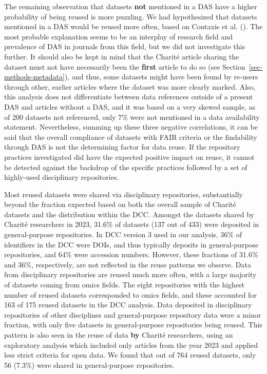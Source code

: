 \documentclass[
  letterpaper,
  DIV=11,
  numbers=noendperiod]{scrartcl}
\begin{document}
The remaining observation that datasets \textbf{not} mentioned in a DAS
have a higher probability of being reused is more puzzling. We had
hypothesized that datasets mentioned in a DAS would be reused more
often, based on Contaxis et al.
(). The most probable
explanation seems to be an interplay of research field and prevalence of
DAS in journals from this field, but we did not investigate this
further. It should also be kept in mind that the Charité article sharing
the dataset must not have necessarily been the \textbf{first} article to
do so (see Section~\ref{sec-methods-metadata}), and thus, some datasets
might have been found by re-users through other, earlier articles where
the dataset was more clearly marked. Also, this analysis does not
differentiate between data references outside of a present DAS and
articles without a DAS, and it was based on a very skewed sample, as of
200 datasets not referenced, only 7\% were not mentioned in a data
availability statement. Nevertheless, summing up these three negative
correlations, it can be said that the overall compliance of datasets
with FAIR criteria or the findability through DAS is not the determining
factor for data reuse. If the repository practices investigated did have
the expected positive impact on reuse, it cannot be detected against the
backdrop of the specific practices followed by a set of highly-used
disciplinary repositories.

Most reused datasets were shared via disciplinary repositories,
substantially beyond the fraction expected based on both the overall
sample of Charité datasets and the distribution within the DCC. Amongst
the datasets shared by Charité researchers in 2023, 31.6\% of datasets
(137 out of 433) were deposited in general-purpose repositories. In DCC
version 3 used in our analysis, 36\% of identifiers in the DCC were
DOIs, and thus typically deposits in general-purpose repositories, and
64\% were accession numbers. However, these fractions of 31.6\% and
36\%, respectively, are not reflected in the reuse patterns we observe.
Data from disciplinary repositories are reused much more often, with a
large majority of datasets coming from omics fields. The eight
repositories with the highest number of reused datasets corresponded to
omics fields, and these accounted for 163 of 175 reused datasets in the
DCC analysis. Data deposited in disciplinary repositories of other
disciplines and general-purpose repository data were a minor fraction,
with only five datasets in general-purpose repositories being reused.
This pattern is also seen in the reuse of data \textbf{by} Charité
researchers, using an exploratory analysis which included only articles
from the year 2023 and applied less strict criteria for open data. We
found that out of 764 reused datasets, only 56 (7.3\%) were shared in
general-purpose repositories.
\end{document}
